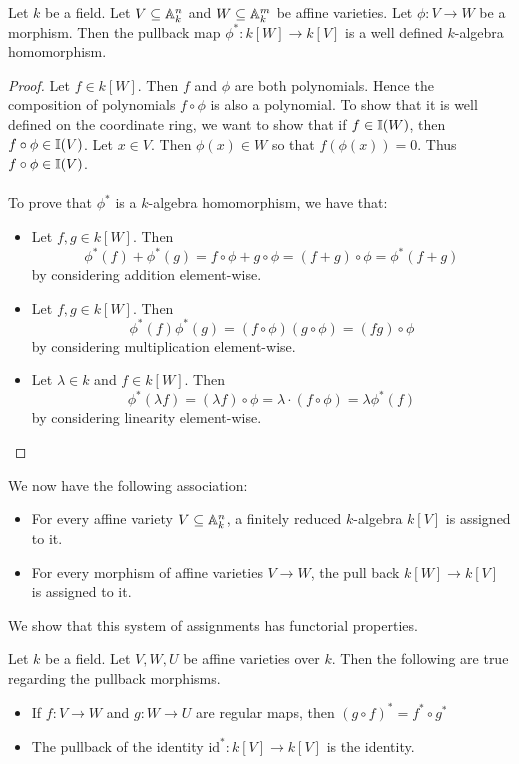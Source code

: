 \documentclass[a4paper]{article}
\begin{document}
\begin{lmm}{}{} Let $k$ be a field. Let $V\subseteq\mathbb{A}_k^n$ and $W\subseteq\mathbb{A}_k^m$ be affine varieties. Let $\phi:V\to W$ be a morphism. Then the pullback map $\phi^\ast:k[W]\to k[V]$ is a well defined $k$-algebra homomorphism. \tcbline
\begin{proof}
Let $f\in k[W]$. Then $f$ and $\phi$ are both polynomials. Hence the composition of polynomials $f\circ\phi$ is also a polynomial. To show that it is well defined on the coordinate ring, we want to show that if $f\in\mathbb{I}(W)$, then $f\circ\phi\in\mathbb{I}(V)$. Let $x\in V$. Then $\phi(x)\in W$ so that $f(\phi(x))=0$. Thus $f\circ\phi\in\mathbb{I}(V)$. \\~\\

To prove that $\phi^\ast$ is a $k$-algebra homomorphism, we have that: 
\begin{itemize}
\item Let $f,g\in k[W]$. Then $$\phi^\ast(f)+\phi^\ast(g)=f\circ\phi+g\circ\phi=(f+g)\circ\phi=\phi^\ast(f+g)$$ by considering addition element-wise. 
\item Let $f,g\in k[W]$. Then $$\phi^\ast(f)\phi^\ast(g)=(f\circ\phi)(g\circ\phi)=(fg)\circ\phi$$ by considering multiplication element-wise. 
\item Let $\lambda\in k$ and $f\in k[W]$. Then $$\phi^\ast(\lambda f)=(\lambda f)\circ\phi=\lambda\cdot(f\circ\phi)=\lambda\phi^\ast(f)$$ by considering linearity element-wise. 
\end{itemize}
\end{proof}
\end{lmm}

We now have the following association:
\begin{itemize}
\item For every affine variety $V\subseteq\mathbb{A}_k^n$, a finitely reduced $k$-algebra $k[V]$ is assigned to it. 
\item For every morphism of affine varieties $V\to W$, the pull back $k[W]\to k[V]$ is assigned to it. 
\end{itemize}
We show that this system of assignments has functorial properties. 

\begin{prp}{}{} Let $k$ be a field. Let $V,W,U$ be affine varieties over $k$. Then the following are true regarding the pullback morphisms. 
\begin{itemize}
\item If $f:V\to W$ and $g:W\to U$ are regular maps, then $(g\circ f)^\ast=f^\ast\circ g^\ast$
\item The pullback of the identity $\text{id}^\ast:k[V]\to k[V]$ is the identity. 
\end{itemize}
\end{prp}
\end{document}
